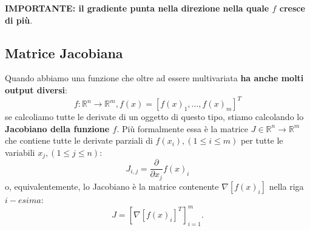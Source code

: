 \textbf{IMPORTANTE: il gradiente punta nella direzione nella quale $f$ cresce di più}.
\newpage

\subsection{Matrice Jacobiana}
Quando abbiamo una funzione che oltre ad essere multivariata \textbf{ha anche molti output diversi}:
\begin{equation}
    f:\mathbb{R}^n\rightarrow \mathbb{R}^m, f(x)=[f(x)_1,\dots,f(x)_m]^T
\end{equation}
se calcoliamo tutte le derivate di un oggetto di questo tipo, stiamo calcolando lo \textbf{Jacobiano della funzione $f$}. Più formalmente essa è la matrice $J\in \mathbb{R}^n\rightarrow \mathbb{R}^m$ che contiene tutte le derivate parziali di $f(x_i),(1\leq i \leq m)$ per tutte le variabili $x_j,(1\leq j \leq n)$:
\begin{equation}
    J_{i,j}=\frac{\partial}{\partial x_j}f(x)_i
\end{equation}
o, equivalentemente, lo Jacobiano è la matrice contenente $\nabla[f(x)_i]$ nella riga $i-esima$:
\begin{equation}
    J=[\nabla[f(x)_i]^T]^m_{i=1}.
\end{equation}

